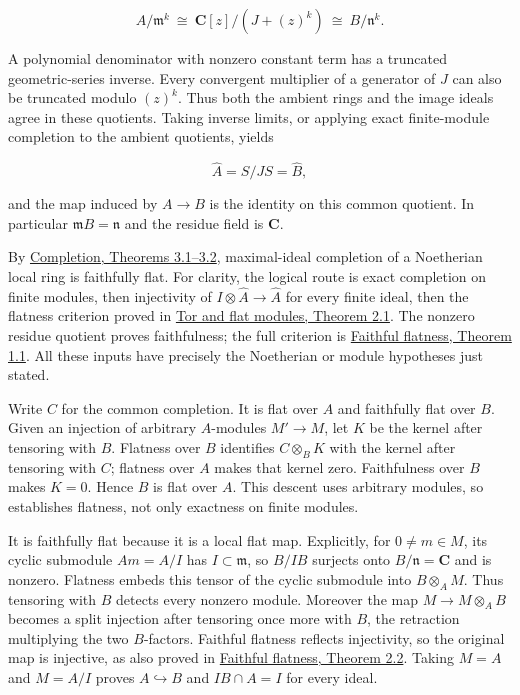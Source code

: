 \documentclass[11pt]{article}
\begin{document}
\[
A/\mathfrak m^k
\ \cong\ \mathbf C[z]/(J+(z)^k)
\ \cong\ B/\mathfrak n^k.
\]

A polynomial denominator with nonzero constant term has a truncated
geometric-series inverse. Every convergent multiplier of a generator of
\(J\) can also be truncated modulo \((z)^k\). Thus both the ambient
rings and the image ideals agree in these quotients. Taking inverse
limits, or applying exact finite-module completion to the ambient
quotients, yields

\[
\widehat A=S/JS=\widehat B,
\]

and the map induced by \(A\to B\) is the identity on this common
quotient. In particular \(\mathfrak mB=\mathfrak n\) and the residue
field is \(\mathbf C\).

By
\href{../../AG-CA/AG-CA-19.html\#3-noetherian-exactness-tensoring-and-flatness}{Completion,
Theorems 3.1--3.2}, maximal-ideal completion of a Noetherian local ring
is faithfully flat. For clarity, the logical route is exact completion
on finite modules, then injectivity of
\(I\otimes\widehat A\to\widehat A\) for every finite ideal, then the
flatness criterion proved in
\href{../../AG-CA/AG-CA-07.html\#2-the-ideal-and-tor-criteria}{Tor and flat
modules, Theorem 2.1}. The nonzero residue quotient proves faithfulness;
the full criterion is
\href{../../AG-CA/AG-CA-08.html\#1-detecting-nonzero-modules}{Faithful
flatness, Theorem 1.1}. All these inputs have precisely the Noetherian
or module hypotheses just stated.

Write \(C\) for the common completion. It is flat over \(A\) and
faithfully flat over \(B\). Given an injection of arbitrary
\(A\)-modules \(M'\to M\), let \(K\) be the kernel after tensoring with
\(B\). Flatness over \(B\) identifies \(C\otimes_BK\) with the kernel
after tensoring with \(C\); flatness over \(A\) makes that kernel zero.
Faithfulness over \(B\) makes \(K=0\). Hence \(B\) is flat over \(A\).
This descent uses arbitrary modules, so establishes flatness, not only
exactness on finite modules.

It is faithfully flat because it is a local flat map. Explicitly, for
\(0\ne m\in M\), its cyclic submodule \(Am=A/I\) has
\(I\subset\mathfrak m\), so \(B/IB\) surjects onto
\(B/\mathfrak n=\mathbf C\) and is nonzero. Flatness embeds this tensor
of the cyclic submodule into \(B\otimes_AM\). Thus tensoring with \(B\)
detects every nonzero module. Moreover the map \(M\to M\otimes_AB\)
becomes a split injection after tensoring once more with \(B\), the
retraction multiplying the two \(B\)-factors. Faithful flatness reflects
injectivity, so the original map is injective, as also proved in \href{../../AG-CA/AG-CA-08.html\#2-faithfully-flat-ring-maps}{Faithful flatness, Theorem 2.2}. Taking \(M=A\) and
\(M=A/I\) proves \(A\hookrightarrow B\) and \(IB\cap A=I\) for every
ideal.
\end{document}
